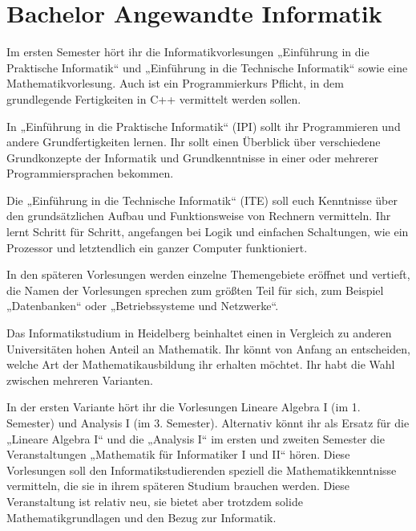 \section{Bachelor Angewandte Informatik}

Im ersten Semester hört ihr die Informatikvorlesungen „Einführung in die Praktische Informatik“
und „Einführung in die Technische Informatik“ sowie eine Mathematikvorlesung.
Auch ist ein Programmierkurs Pflicht, in dem grundlegende Fertigkeiten in C++ vermittelt werden
sollen.

In „Einführung in die Praktische Informatik“ (IPI) sollt ihr Programmieren
und andere Grundfertigkeiten lernen. Ihr sollt einen Überblick über verschiedene Grundkonzepte der
Informatik und Grundkenntnisse in einer oder mehrerer Programmiersprachen bekommen.

Die „Einführung in die Technische Informatik“ (ITE) soll euch Kenntnisse über den
grundsätzlichen Aufbau und Funktionsweise von Rechnern vermitteln. Ihr lernt Schritt für Schritt,
angefangen bei Logik und einfachen Schaltungen, wie ein Prozessor und letztendlich ein ganzer Computer funktioniert.

In den späteren Vorlesungen werden einzelne Themengebiete eröffnet und vertieft, die Namen der
Vorlesungen sprechen zum größten Teil für sich, zum Beispiel „Datenbanken“ oder „Betriebssysteme
und Netzwerke“.

Das Informatikstudium in Heidelberg beinhaltet einen in Vergleich zu anderen Universitäten hohen
Anteil an Mathematik. Ihr könnt von Anfang an entscheiden, welche Art der Mathematikausbildung ihr
erhalten möchtet. Ihr habt die Wahl zwischen mehreren Varianten.

In der ersten Variante hört ihr die Vorlesungen Lineare Algebra I (im 1.
Semester) und Analysis I (im 3. Semester). Alternativ könnt ihr als Ersatz für
die „Lineare Algebra I“ und die „Analysis I“ im ersten und zweiten Semester die
Veranstaltungen „Mathematik für Informatiker I und II“ hören.  Diese
Vorlesungen soll den Informatikstudierenden speziell die Mathematikkenntnisse
vermitteln, die sie in ihrem späteren Studium brauchen werden. Diese
Veranstaltung ist relativ neu, sie bietet aber trotzdem solide
Mathematikgrundlagen und den Bezug zur Informatik.


